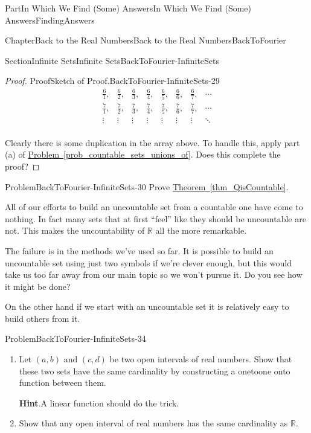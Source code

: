 \documentclass[oneside,10pt,]{book}
\newcommand{\blocktitlefont}{\relax}
\newcommand{\xreffont}{\relax}
\numberwithin{equation}{part}
\newcommand{\RR}{\mathbb {R}}
\newcommand{\amp}{&}
\begin{document}
\begin{partptx}{Part}{In Which We Find (Some) Answers}{}{In Which We Find (Some) Answers}{}{}{FindingAnswers}
\begin{chapterptx}{Chapter}{Back to the Real Numbers}{}{Back to the Real Numbers}{}{}{BackToFourier}
\begin{sectionptx}{Section}{Infinite Sets}{}{Infinite Sets}{}{}{BackToFourier-InfiniteSets}
\begin{proof}{Proof}{Sketch of Proof.}{BackToFourier-InfiniteSets-29}
\begin{equation*}
\begin{array}{cccccccc}
\frac61,\amp{}\frac62,\amp{}\frac63,\amp{}\frac64,\amp{}\frac65,\amp{}\frac66,\amp{}\frac67,\amp{}\cdots\\
\frac71,\amp{}\frac72,\amp{}\frac73,\amp{}\frac74,\amp{}\frac75,\amp{}\frac76,\amp{}\frac77,\amp{}\cdots\\
\vdots\amp{} \vdots{}\amp{}\vdots{}\amp{}\vdots{}\amp{}\vdots{}\amp{}\vdots{}\amp{}\vdots{}\amp{}\ddots\\
\end{array}
\end{equation*}
\par
Clearly there is some duplication in the array above.  To handle this, apply part (a) of \hyperref[prob_countable_sets_unions_of]{Problem~{\xreffont\ref{prob_countable_sets_unions_of}}}.  Does this complete the proof?%
\end{proof}
\begin{problem}{Problem}{}{BackToFourier-InfiniteSets-30}%
Prove \hyperref[thm_QisCountable]{Theorem~{\xreffont\ref{thm_QisCountable}}}.%
\end{problem}
All of our efforts to build an uncountable set from a countable one have come to nothing.  In fact many sets that at first ``feel'' like they should be uncountable are not. This makes the uncountability of \(\RR\) all the more remarkable.%
\par
The failure is in the methods we've used so far.  It is possible to build an uncountable set using just two symbols if we're clever enough, but this would take us too far away from our main topic so we won't pursue it. Do you see how it might be done?%
\par
On the other hand if we start with an uncountable set it is relatively easy to build others from it.%
\begin{problem}{Problem}{}{BackToFourier-InfiniteSets-34}%
\begin{enumerate}[font=\bfseries,label=(\alph*),ref=\alph*]%
\item{}Let \((a,b)\) and \((c,d)\) be two open intervals of real numbers.  Show that these two sets have the same cardinality by constructing a one\textendash{}to\textendash{}one onto function between them.%
\par\smallskip%
\noindent\textbf{\blocktitlefont Hint}.\hypertarget{BackToFourier-InfiniteSets-34-2-2}{}\quad{}A linear function should do the trick.%
\item{}Show that any open interval of real numbers has the same cardinality as \(\RR\).%
\par\smallskip%

\end{enumerate}
\end{problem}
\end{sectionptx}
\end{chapterptx}
\end{partptx}
\end{document}
